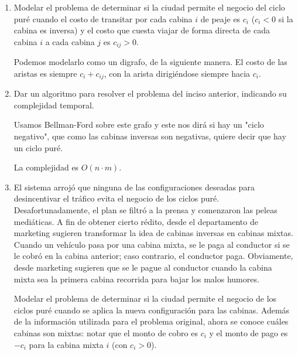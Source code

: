 \documentclass{article}
\begin{document}
\begin{enumerate}
    \item Modelar el problema de determinar si la ciudad permite el negocio del ciclo puré cuando el costo de transitar por cada cabina $i$ de peaje es $c_i$ ($c_i < 0$ si la cabina es inversa) y el costo que cuesta viajar de forma directa de cada cabina $i$ a cada cabina $j$ es $c_{ij} > 0$.
    
    Podemos modelarlo como un digrafo, de la siguiente manera. El costo de las aristas es siempre $c_i + c_{ij}$, con la arista dirigiéndose siempre hacia $c_i$.
    
    \item Dar un algoritmo para resolver el problema del inciso anterior, indicando su complejidad temporal.
    
    Usamos Bellman-Ford sobre este grafo y este nos dirá si hay un "ciclo negativo", que como las cabinas inversas son negativas, quiere decir que hay un ciclo puré.
    
    La complejidad es $O(n \cdot m)$.
    
    \item El sistema arrojó que ninguna de las configuraciones deseadas para desincentivar el tráfico evita el negocio de los ciclos puré. Desafortunadamente, el plan se filtró a la prensa y comenzaron las peleas mediáticas. A fin de obtener cierto rédito, desde el departamento de marketing sugieren transformar la idea de cabinas inversas en cabinas mixtas. Cuando un vehículo pasa por una cabina mixta, se le paga al conductor si se le cobró en la cabina anterior; caso contrario, el conductor paga. Obviamente, desde marketing sugieren que se le pague al conductor cuando la cabina mixta sea la primera cabina recorrida para bajar los malos humores.
    
    Modelar el problema de determinar si la ciudad permite el negocio de los ciclos puré cuando se aplica la nueva configuración para las cabinas. Además de la información utilizada para el problema original, ahora se conoce cuáles cabinas son mixtas: notar que el monto de cobro es $c_i$ y el monto de pago es $-c_i$ para la cabina mixta $i$ (con $c_i > 0$).
\end{enumerate}
\end{document}
